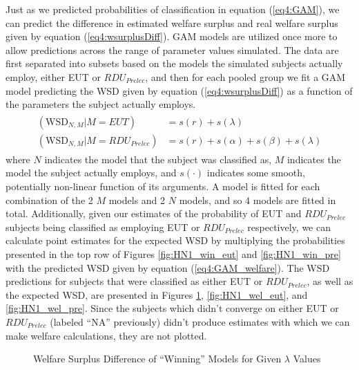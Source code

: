 \documentclass[../main.tex]{subfiles}
\begin{document}
Just as we predicted probabilities of classification in equation (\ref{eq4:GAM}), we can predict the difference in estimated welfare surplus and real welfare surplus given by equation (\ref{eq4:wsurplusDiff}).
GAM models are utilized once more to allow predictions across the range of parameter values simulated.
The data are first separated into subsets based on the models the simulated subjects actually employ, either EUT or $\mathit{RDU_{Prelec}}$, and then for each pooled group we fit a GAM model predicting the WSD given by equation (\ref{eq4:wsurplusDiff}) as a function of the parameters the subject actually employs.
\begin{align}
	\label{eq4:GAM_welfare}
	\begin{split}
		(\text{WSD}_{N,M} | M = EUT)                   &= s(r) + s(\lambda)\\
		(\text{WSD}_{N,M} | M = \mathit{RDU_{Prelec}}) &= s(r) + s(\alpha) + s(\beta) + s(\lambda)
	\end{split}
\end{align}
\noindent where $N$ indicates the model that the subject was classified as, $M$ indicates the model the subject actually employs, and $s(\cdot)$ indicates some smooth, potentially non-linear function of its arguments.
A model is fitted for each combination of the 2 $M$ models and 2 $N$ models, and so 4 models are fitted in total.
Additionally, given our estimates of the probability of EUT and $\mathit{RDU_{Prelec}}$ subjects being classified as employing EUT or $\mathit{RDU_{Prelec}}$ respectively, we can calculate point estimates for the expected WSD by multiplying the probabilities presented in the top row of Figures \ref{fig:HN1_win_eut} and \ref{fig:HN1_win_pre} with the predicted WSD given by equation (\ref{eq4:GAM_welfare}).
The WSD predictions for subjects that were classified as either EUT or $\mathit{RDU_{Prelec}}$, as well as the expected WSD, are presented in Figures \ref{fig:HN1_wel_mu}, \ref{fig:HN1_wel_eut}, and \ref{fig:HN1_wel_pre}.
Since the subjects which didn't converge on either EUT or $\mathit{RDU_{Prelec}}$ (labeled \enquote{NA} previously) didn't produce estimates with which we can make welfare calculations, they are not plotted.

\begin{figure}[ht!]
	\center
	\caption{Welfare Surplus Difference of \enquote{Winning} Models for Given $\lambda$ Values}
	\label{fig:HN1_wel_mu}
\end{figure}
\end{document}
